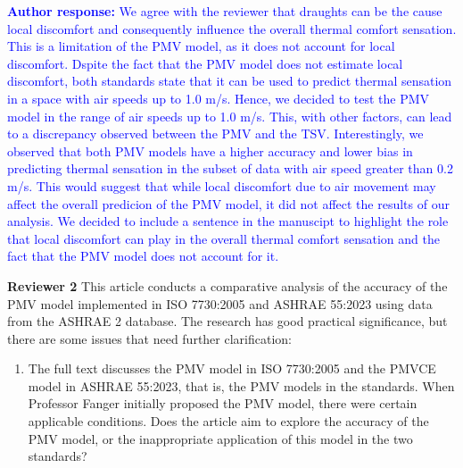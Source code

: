 \documentclass[a4paper, 10pt]{letter}
\newcommand{\response}[1]{\textcolor{blue}{\textbf{Author response:} #1}}
\begin{document}
\begin{letter}
\begin{enumerate}
            \response{
                We agree with the reviewer that draughts can be the cause local discomfort and consequently influence the overall thermal comfort sensation.
                This is a limitation of the PMV model, as it does not account for local discomfort.
                Dspite the fact that the PMV model does not estimate local discomfort, both standards state that it can be used to predict thermal sensation in a space with air speeds up to 1.0 m/s.
                Hence, we decided to test the PMV model in the range of air speeds up to 1.0 m/s.
                This, with other factors, can lead to a discrepancy observed between the PMV and the TSV.
                Interestingly, we observed that both PMV models have a higher accuracy and lower bias in predicting thermal sensation in the subset of data with air speed greater than 0.2 m/s.
                This would suggest that while local discomfort due to air movement may affect the overall predicion of the PMV model, it did not affect the results of our analysis.
                We decided to include a sentence in the manuscipt to highlight the role that local discomfort can play in the overall thermal comfort sensation and the fact that the PMV model does not account for it.
            }

        \end{enumerate}

        \textbf{Reviewer 2}
        This article conducts a comparative analysis of the accuracy of the PMV model implemented in ISO 7730:2005 and ASHRAE 55:2023 using data from the ASHRAE 2 database.
        The research has good practical significance, but there are some issues that need further clarification:

        \begin{enumerate}
            \item The full text discusses the PMV model in ISO 7730:2005 and the PMVCE model in ASHRAE 55:2023, that is, the PMV models in the standards.
            When Professor Fanger initially proposed the PMV model, there were certain applicable conditions.
            Does the article aim to explore the accuracy of the PMV model, or the inappropriate application of this model in the two standards?


\end{enumerate}
\end{letter}
\end{document}
